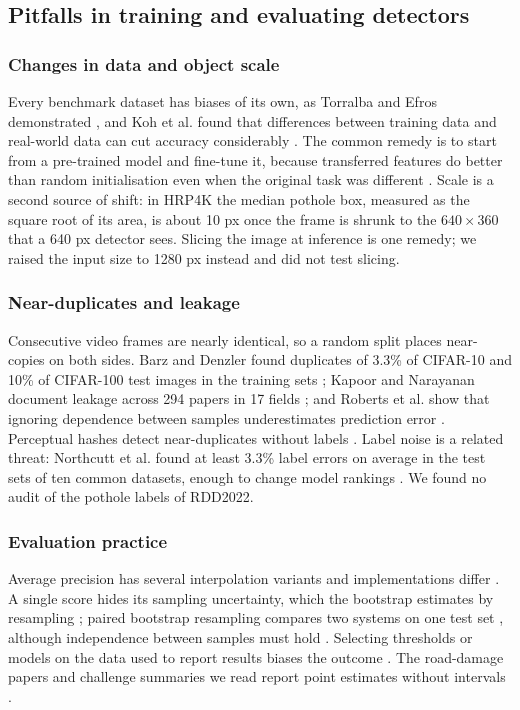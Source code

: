 \subsection{Pitfalls in training and evaluating detectors}
\subsubsection*{Changes in data and object scale}
Every benchmark dataset has biases of its own, as Torralba and Efros demonstrated \cite{torralba2011unbiased}, and Koh et al. found that differences between training data and real-world data can cut accuracy considerably \cite{koh2021wilds}. The common remedy is to start from a pre-trained model and fine-tune it, because transferred features do better than random initialisation even when the original task was different \cite{yosinski2014transferable}. Scale is a second source of shift: in HRP4K the median pothole box, measured as the square root of its area, is about 10 px once the frame is shrunk to the $640 \times 360$ that a 640 px detector sees. Slicing the image at inference \cite{akyon2022sahi} is one remedy; we raised the input size to 1280 px instead and did not test slicing.

\subsubsection*{Near-duplicates and leakage}
Consecutive video frames are nearly identical, so a random split places near-copies on both sides. Barz and Denzler found duplicates of 3.3\% of CIFAR-10 and 10\% of CIFAR-100 test images in the training sets \cite{barz2020train}; Kapoor and Narayanan document leakage across 294 papers in 17 fields \cite{kapoor2023leakage}; and Roberts et al. show that ignoring dependence between samples underestimates prediction error \cite{roberts2017crossvalidation}. Perceptual hashes detect near-duplicates without labels \cite{zauner2011rihamark}. Label noise is a related threat: Northcutt et al. found at least 3.3\% label errors on average in the test sets of ten common datasets, enough to change model rankings \cite{northcutt2021pervasive}. We found no audit of the pothole labels of RDD2022.

\subsubsection*{Evaluation practice}
Average precision has several interpolation variants and implementations differ \cite{padilla2020survey}. A single score hides its sampling uncertainty, which the bootstrap estimates by resampling \cite{efron1993bootstrap}; paired bootstrap resampling compares two systems on one test set \cite{koehn2004significance}, although independence between samples must hold \cite{bergkirkpatrick2012significance}. Selecting thresholds or models on the data used to report results biases the outcome \cite{cawley2010overfitting}. The road-damage papers and challenge summaries we read report point estimates without intervals \cite{zeng2024yolov8pd,arya2022crddc}.


